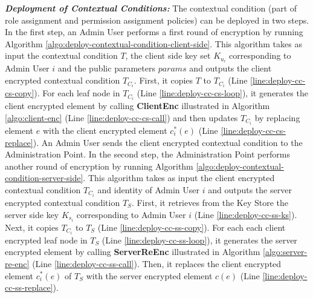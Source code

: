 \documentclass[final,5p,times,twocolumn]{elsarticle}
\begin{document}
\emph{\textbf{Deployment of Contextual Conditions:}}
The contextual condition (part of role assignment and permission assignment policies) can be deployed in two steps. In the first step, an Admin User performs a first round of encryption by running Algorithm \ref{algo:deploy-contextual-condition-client-side}. This algorithm takes as input the contextual condition $T$, the client side key set $K_{u_i}$ corresponding to Admin User $i$ and the public parameters $params$ and outputs the client encrypted contextual condition $T_{C_i}$. First, it copies $T$ to $T_{C_i}$ (Line \ref{line:deploy-cc-cs-copy}). For each leaf node in $T_{C_i}$ (Line \ref{line:deploy-cc-cs-loop}), it generates the client encrypted element by calling \textbf{ClientEnc} illustrated in Algorithm \ref{algo:client-enc} (Line \ref{line:deploy-cc-cs-call}) and then updates $T_{C_i}$ by replacing element $e$ with the client encrypted element $c^*_i (e)$ (Line \ref{line:deploy-cc-cs-replace}). An Admin User sends the client encrypted contextual condition to the Administration Point.
In the second step, the Administration Point performs another round of encryption by running Algorithm \ref{algo:deploy-contextual-condition-server-side}. This algorithm takes as input the client encrypted contextual condition $T_{C_i}$ and identity of Admin User $i$ and outputs the server encrypted contextual condition $T_{S}$. First, it retrieves from the Key Store the server side key $K_{s_i}$ corresponding to Admin User $i$ (Line \ref{line:deploy-cc-ss-ks}). Next, it copies $T_{C_i}$ to $T_{S}$ (Line \ref{line:deploy-cc-ss-copy}). For each each client encrypted leaf node in $T_{S}$ (Line \ref{line:deploy-cc-ss-loop}), it generates the server encrypted element by calling \textbf{ServerReEnc} illustrated in Algorithm \ref{algo:server-re-enc} (Line \ref{line:deploy-cc-ss-call}). Then, it replaces the client encrypted element $c^*_i (e)$ of $T_{S}$ with the server encrypted element $c(e)$ (Line \ref{line:deploy-cc-ss-replace}).
\end{document}
